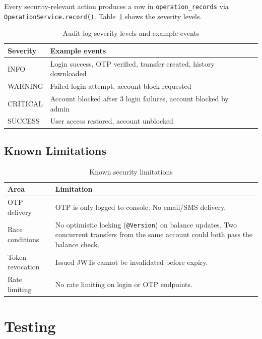 \documentclass[12pt,a4paper]{report}
\begin{document}
Every security-relevant action produces a row in \texttt{operation\_records} via
\texttt{OperationService.record()}. Table~\ref{tab:audit} shows the severity levels.

\begin{table}[H]
  \centering
  \caption{Audit log severity levels and example events}
  \label{tab:audit}
  \begin{tabular}{lll}
    \toprule
    \textbf{Severity} & \textbf{Example events} \\
    \midrule
    INFO     & Login success, OTP verified, transfer created, history downloaded \\
    WARNING  & Failed login attempt, account block requested \\
    CRITICAL & Account blocked after 3 login failures, account blocked by admin \\
    SUCCESS  & User access restored, account unblocked \\
    \bottomrule
  \end{tabular}
\end{table}

\section{Known Limitations}

\begin{table}[H]
  \centering
  \caption{Known security limitations}
  \begin{tabular}{lp{9cm}}
    \toprule
    \textbf{Area} & \textbf{Limitation} \\
    \midrule
    OTP delivery   & OTP is only logged to console. No email/SMS delivery. \\
    Race conditions& No optimistic locking (\texttt{@Version}) on balance updates.
                     Two concurrent transfers from the same account could both pass
                     the balance check. \\
    Token revocation & Issued JWTs cannot be invalidated before expiry. \\
    Rate limiting  & No rate limiting on login or OTP endpoints. \\
    \bottomrule
  \end{tabular}
\end{table}

\chapter{Testing}
\label{ch:testing}
\end{document}
